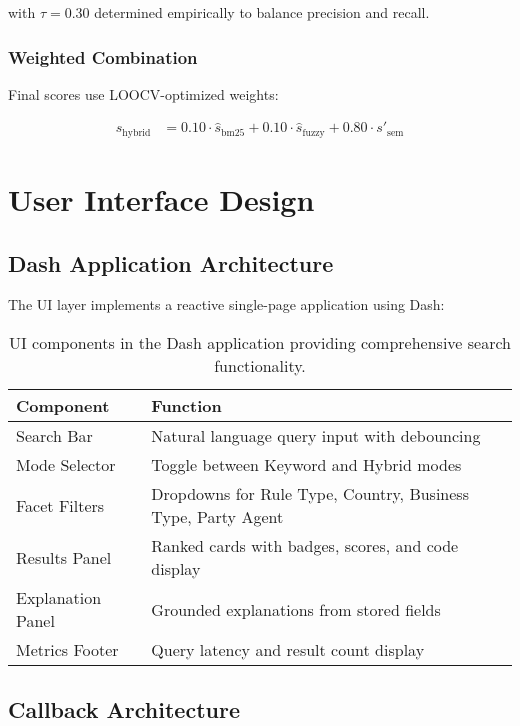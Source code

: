 with $\tau = 0.30$ determined empirically to balance precision and recall.

\subsubsection{Weighted Combination}

Final scores use LOOCV-optimized weights:

\begin{align}
s_{\text{hybrid}} &= 0.10 \cdot \hat{s}_{\text{bm25}} + 0.10 \cdot \hat{s}_{\text{fuzzy}} + 0.80 \cdot s'_{\text{sem}}
\end{align}

\section{User Interface Design}

\subsection{Dash Application Architecture}

The UI layer implements a reactive single-page application using Dash:

\begin{table}[ht]
\centering
\begin{tabular}{ll}
\toprule
\textbf{Component} & \textbf{Function} \\
\midrule
Search Bar & Natural language query input with debouncing \\
Mode Selector & Toggle between Keyword and Hybrid modes \\
Facet Filters & Dropdowns for Rule Type, Country, Business Type, Party Agent \\
Results Panel & Ranked cards with badges, scores, and code display \\
Explanation Panel & Grounded explanations from stored fields \\
Metrics Footer & Query latency and result count display \\
\bottomrule
\end{tabular}
\caption{UI components in the Dash application providing comprehensive search functionality.}
\label{tab:ui-components}
\end{table}

\subsection{Callback Architecture}

